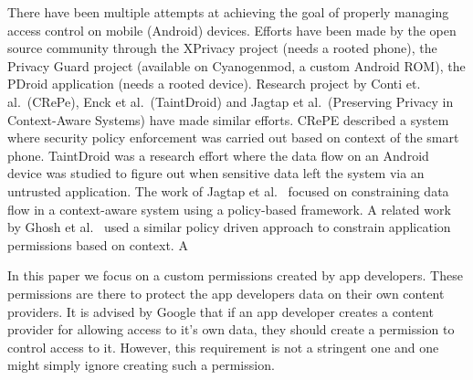 There have been multiple attempts at achieving the goal of properly managing access control on mobile (Android) devices. Efforts have been made by the open source community through the XPrivacy project (needs a rooted phone), the Privacy Guard project (available on Cyanogenmod, a custom Android ROM), the PDroid application (needs a rooted device). Research project by Conti et. al.~\cite{conti2011crepe}(CRePe), Enck et al.~\cite{enck2010taintdroid}(TaintDroid) and Jagtap et al.~\cite{Jagtap2011Privacy}(Preserving Privacy in Context-Aware Systems) have made similar efforts. CRePE described a system where security policy enforcement was carried out based on context of the smart phone. TaintDroid was a research effort where the data flow on an Android device was studied to figure out when sensitive data left the system via an untrusted application. The work of Jagtap et al.~\cite{Jagtap2011Privacy} focused on constraining data flow in a context-aware system using a policy-based framework. A related work by Ghosh et al.~\cite{ghosh2012privacy} used a similar policy driven approach to constrain application permissions based on context. A %

In this paper we focus on a custom permissions created by app developers. These permissions are there to protect the app developers data on their own content providers. It is advised by Google that if an app developer creates a content provider for allowing access to it's own data, they should create a permission to control access to it. However, this requirement is not a stringent one and one might simply ignore creating such a permission.


